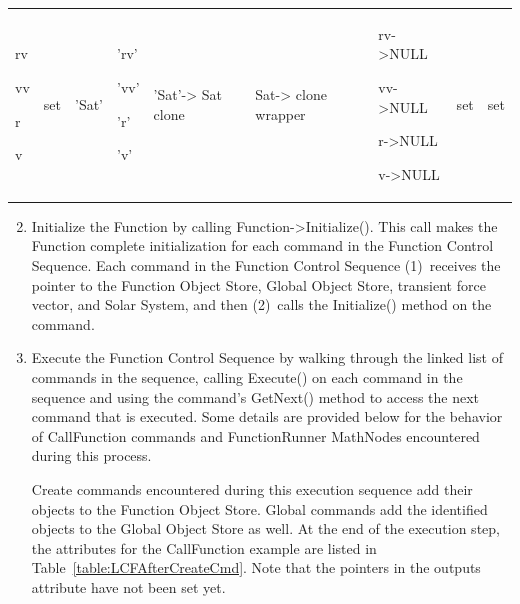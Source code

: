 \begin{center}
\begin{supertabular}{|p{0.5in}|p{0.5in}|p{0.4in}|p{0.4in}|p{0.5in}|p{0.68in}|p{0.67in}|p{0.5in}|
p{0.5in}|}
\begin{small}
rv

vv

r

v
\end{small} &
\begin{small}
set
\end{small} &
\begin{small}
'Sat'
\end{small} &
\begin{small}
'rv'

'vv'

'r'

'v'
\end{small} &
\begin{small}
'Sat'-> Sat clone
\end{small} &
\begin{small}
Sat-> clone wrapper
\end{small} &
\begin{small}
rv->NULL

vv->NULL

r->NULL

v->NULL
\end{small} &
\begin{small}
set
\end{small} &
\begin{small}
set
\end{small} \\
\end{supertabular}
\end{center}

\begin{enumerate}
\setcounter{enumi}{1}
\item Initialize the Function by calling
Function-{\textgreater}Initialize().  This call makes the Function complete initialization for each
command in the Function Control Sequence.  Each command in the Function Control Sequence
(1)~receives the pointer to the Function Object Store, Global Object Store, transient force vector,
and Solar System, and then (2)~calls the Initialize() method on the command.

\item Execute the Function Control Sequence by walking through the linked list of commands in the
sequence, calling Execute() on each command in the sequence and using the command's GetNext() method
to access the next command that is executed.  Some details are provided below for the behavior of
CallFunction commands and FunctionRunner MathNodes encountered during this process.

Create commands encountered during this execution sequence add their objects to the Function Object
Store.  Global commands add the identified objects to the Global Object Store as well.  At the end
of the execution step, the attributes for the CallFunction example are listed in
Table~\ref{table:LCFAfterCreateCmd}.  Note that the pointers in the outputs attribute have not been
set yet.
\end{enumerate}


